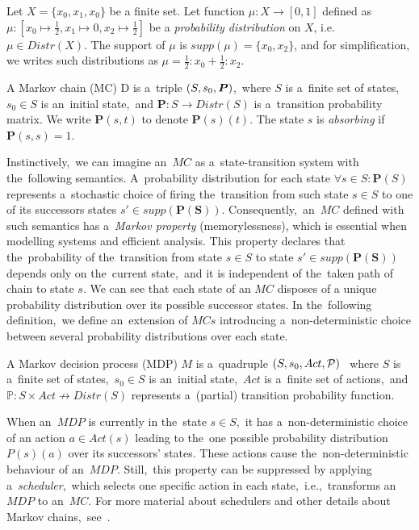\begin{example}
    Let $X = \{x_0, x_1, x_0\}$ be a finite set.
    Let function $\mu: X \rightarrow [0,1]$ defined as $\mu: [x_0 \mapsto \frac{1}{2}, x_1 \mapsto 0, x_2 \mapsto \frac{1}{2}]$ be a \textit{probability distribution} on $X$, i.e. $\mu \in Distr(X)$.
    The support of $\mu$ is $supp(\mu) = \{x_0, x_2 \}$, and for simplification, we writes such distributions as $\mu = \frac{1}{2} : x_0 + \frac{1}{2} : x_2$.
\end{example}


\begin{definition}[MC]
\cite{tacas21}
    A Markov chain (MC) D is a~triple $(S,s_{0},\boldsymbol{P})$,~where $S$ is a~finite set of states,~$s_0 \in S$ is an~initial state,~and $\mathbf{P}: S \rightarrow Distr(S)$ is a~transition probability matrix.
    We write $\mathbf{P}(s, t)$ to denote $\mathbf{P}(s)(t)$.
    The state $s$ is \textit{absorbing} if $\mathbf{P}(s, s) = 1$.
\end{definition}

Instinctively,~we can imagine an~$MC$ as a~state-transition system with the~following semantics.
A~probability distribution for each state $\forall s \in S: \mathbf{P}(S)$ represents a~stochastic choice of firing the~transition from such state $s \in S$ to one of its successors states $s' \in supp(\mathbf{P(S)})$.
Consequently,~an~$MC$ defined with such semantics has a~\textit{Markov property} (memorylessness), which is essential when modelling systems and efficient analysis.
This property declares that the~probability of the~transition from state $s \in S$ to state $s' \in supp(\mathbf{P(S)})$ depends only on the~current state,~and it is independent of the~taken path of chain to state $s$.
We can see that each state of an $MC$ disposes of a unique probability distribution over its possible successor states.
In the~following definition,~we define an~extension of $MCs$ introducing a~non-deterministic choice between several probability distributions over each state.

\begin{definition}[MDP]
\cite{roman-DP}
    A Markov decision process (MDP) $M$ is a~quadruple $(S,s_{0},Act,\mathcal{P})$ ~where $S$ is a~finite set of states,~$s_0 \in S$ is an~initial state,~$Act$ is a~finite set of actions,~and $\mathbb{P}: S \times Act  \nrightarrow Distr(S)$ represents a~(partial) transition probability function. 
\end{definition}

When an~$MDP$ is currently in the~state $s \in S$,~it has a~non-deterministic choice of an action $a \in Act(s)$ leading to the~one possible probability distribution $P(s)(a)$ over its successors' states.
These actions cause the~non-deterministic behaviour of an~$MDP$.
Still,~this property can be suppressed by applying a~\textit{scheduler},~which selects one specific action in each state,~i.e.,~transforms an~$MDP$ to an~$MC$.
For more material about schedulers and other details about Markov chains,~see~\cite{roman-DP}.

